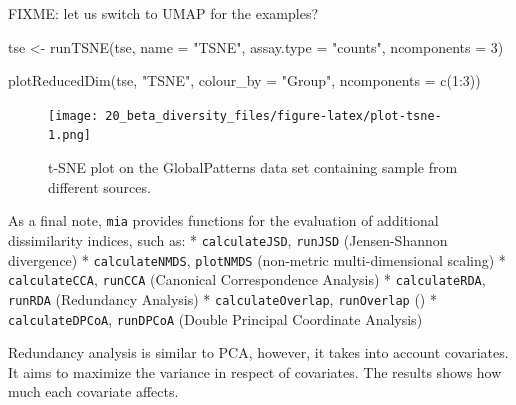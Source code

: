 \documentclass[
]{book}
\newenvironment{Shaded}{\begin{snugshade}}{\end{snugshade}}
\newcommand{\AttributeTok}[1]{\textcolor[rgb]{0.77,0.63,0.00}{#1}}
\newcommand{\DecValTok}[1]{\textcolor[rgb]{0.00,0.00,0.81}{#1}}
\newcommand{\FunctionTok}[1]{\textcolor[rgb]{0.00,0.00,0.00}{#1}}
\newcommand{\NormalTok}[1]{#1}
\newcommand{\OtherTok}[1]{\textcolor[rgb]{0.56,0.35,0.01}{#1}}
\newcommand{\SpecialCharTok}[1]{\textcolor[rgb]{0.00,0.00,0.00}{#1}}
\newcommand{\StringTok}[1]{\textcolor[rgb]{0.31,0.60,0.02}{#1}}
\begin{document}
FIXME: let us switch to UMAP for the examples?

\begin{Shaded}
\begin{Highlighting}[]
\NormalTok{tse }\OtherTok{\textless{}{-}} \FunctionTok{runTSNE}\NormalTok{(tse, }\AttributeTok{name =} \StringTok{"TSNE"}\NormalTok{, }\AttributeTok{assay.type =} \StringTok{"counts"}\NormalTok{, }\AttributeTok{ncomponents =} \DecValTok{3}\NormalTok{)}
\end{Highlighting}
\end{Shaded}

\begin{Shaded}
\begin{Highlighting}[]
\FunctionTok{plotReducedDim}\NormalTok{(tse, }\StringTok{"TSNE"}\NormalTok{, }\AttributeTok{colour\_by =} \StringTok{"Group"}\NormalTok{, }\AttributeTok{ncomponents =} \FunctionTok{c}\NormalTok{(}\DecValTok{1}\SpecialCharTok{:}\DecValTok{3}\NormalTok{))}
\end{Highlighting}
\end{Shaded}

\begin{figure}
\centering
\texttt{[image: 20\_beta\_diversity\_files/figure-latex/plot-tsne-1.png]}
\caption{\label{fig:plot-tsne}t-SNE plot on the GlobalPatterns data set containing sample from different sources.}
\end{figure}

As a final note, \texttt{mia} provides functions for the evaluation of additional dissimilarity indices, such as:
* \texttt{calculateJSD}, \texttt{runJSD} (Jensen-Shannon divergence)
* \texttt{calculateNMDS}, \texttt{plotNMDS} (non-metric multi-dimensional scaling)
* \texttt{calculateCCA}, \texttt{runCCA} (Canonical Correspondence Analysis)
* \texttt{calculateRDA}, \texttt{runRDA} (Redundancy Analysis)
* \texttt{calculateOverlap}, \texttt{runOverlap} ()
* \texttt{calculateDPCoA}, \texttt{runDPCoA} (Double Principal Coordinate Analysis)

Redundancy analysis is similar to PCA, however, it takes into account covariates.
It aims to maximize the variance in respect of covariates. The results shows how much
each covariate affects.
\end{document}
